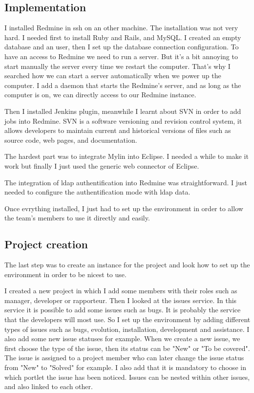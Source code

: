 
\subsection{Implementation}


I installed Redmine in ssh on an other machine. The installation was not very 
hard. I needed first to install Ruby and
Rails, and MySQL. I created an empty database and an user, then I set up the 
database connection configuration. 
To have an access to Redmine we need to run a server. But it's a bit annoying to start 
manually the server every time we restart the computer. 
That's why I searched how we can start a server automatically when we power up the computer. 
I add a daemon that starts the Redmine's server, and as long as the computer is on, 
we can directly access to our Redmine instance. 

Then I installed Jenkins plugin, meanwhile I learnt about SVN in order to add jobs into Redmine. 
SVN is a software versioning and revision control system, it allows developers to 
maintain current and historical versions of files such as source code, web pages, 
and documentation. 
 
The hardest part was to integrate Mylin into Eclipse. I needed a while to make it work but finally I just used the generic web connector of Eclipse. 

The integration of ldap authentification into Redmine was straightforward. I just 
needed to configure the authentification mode with ldap data.  

Once evrything installed, I just had to set up the environment in order to allow
the team's members to use it directly and easily.


\subsection{Project creation}

The last step was to create an instance for the project and look how to set up the environment in order to be nicest to use. 

I created a new project in which I add some members with their roles such as manager, 
developer or rapporteur. Then I looked at the issues service. In this service it is 
possible to add some issues such as bugs. It is probably the service that the developers
will most use. So I set up the environment by adding different types of issues such
as bugs, evolution, installation, development and assistance. 
I also add some new issue statuses for example. 
When we create a new issue, we first choose the type of the issue, then its status 
can be "New" or "To be covered". The issue is 
assigned to a project member who can later change the issue status from "New" to "Solved"
for example. I also add that it is mandatory to choose in which portlet the issue 
has been noticed. Issues can be nested within other issues, and also linked to each other.

